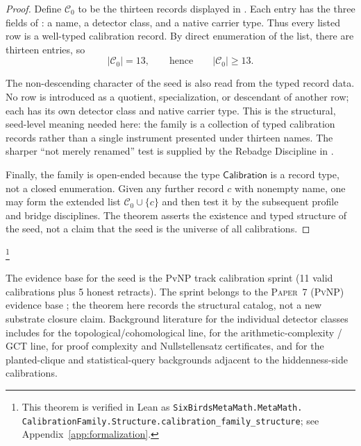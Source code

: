 \documentclass[11pt]{article}
\newcommand{\PaperPvNP}{\textsc{Paper~7 (PvNP)}}
\theoremstyle{definition}
\begin{document}
\begin{proof}
Define \(\mathcal C_0\) to be the thirteen records displayed in
.  Each entry has the three fields of
: a name, a detector class, and a native carrier
type.  Thus every listed row is a well-typed calibration record.  By
direct enumeration of the list, there are thirteen entries, so
\[
  |\mathcal C_0|=13,
  \qquad\text{hence}\qquad
  |\mathcal C_0|\ge 13 .
\]

The non-descending character of the seed is also read from the typed
record data.  No row is introduced as a quotient, specialization, or
descendant of another row; each has its own detector class and native
carrier type.  This is the structural, seed-level meaning needed here:
the family is a collection of typed calibration records rather than a
single instrument presented under thirteen names.  The sharper
``not merely renamed'' test is supplied by the Rebadge Discipline in
.

Finally, the family is open-ended because the type
\(\mathsf{Calibration}\) is a record type, not a closed enumeration.
Given any further record \(c\) with nonempty name, one may form the
extended list \(\mathcal C_0\cup\{c\}\) and then test it by the
subsequent profile and bridge disciplines.  The theorem asserts the
existence and typed structure of the seed, not a claim that the seed is
the universe of all calibrations.
\end{proof}\footnote{\raggedright This theorem is verified in Lean as
\texttt{SixBirdsMetaMath.MetaMath.\allowbreak
CalibrationFamily.Structure.\allowbreak calibration\_family\_structure};
see Appendix~\ref{app:formalization}.}

The evidence base for the seed is the PvNP track calibration sprint (11
valid calibrations plus 5 honest retracts).  The sprint belongs to the
\PaperPvNP{} evidence base \cite{Tsiokos2026PvNP}; the theorem here
records the structural catalog, not a new substrate closure claim.
Background literature for the individual detector classes includes
\cite{Lovasz1978Kneser} for the topological/cohomological line,
\cite{MulmuleySohoni2001GCT} for the arithmetic-complexity / GCT line,
\cite{Krajicek2019ProofComplexity} for proof complexity and
Nullstellensatz certificates, and
\cite{AlonKrivelevichSudakov1998PlantedClique,Kearns1998SQ} for the
planted-clique and statistical-query backgrounds adjacent to the
hiddenness-side calibrations.
\end{document}

